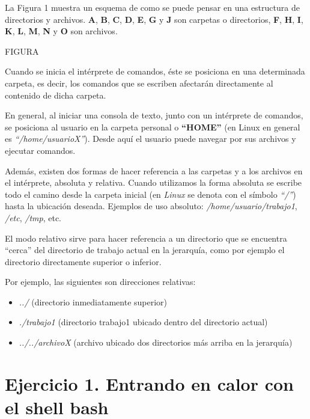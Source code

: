 \documentclass[12pt]{article}
\begin{document}
La Figura 1 muestra un esquema de como se puede pensar en una estructura de
directorios y archivos. \textbf{A}, \textbf{B}, \textbf{C}, \textbf{D},
\textbf{E}, \textbf{G} y \textbf{J} son carpetas o directorios, \textbf{F},
\textbf{H}, \textbf{I}, \textbf{K}, \textbf{L}, \textbf{M}, \textbf{N} y
\textbf{O} son archivos.

FIGURA

Cuando se inicia el intérprete de comandos, éste se posiciona en una
determinada carpeta, es decir, los comandos que se escriben afectarán
directamente al contenido de dicha carpeta.

En general, al iniciar una consola de texto, junto con un intérprete de
comandos, se posiciona al usuario en la carpeta personal o \textbf{``HOME''}
(en Linux en general es \emph{``/home/usuarioX''}). Desde aquí el usuario
puede navegar por sus archivos y ejecutar comandos.

Además, existen dos formas de hacer referencia a las carpetas y a los archivos
en el intérprete, absoluta y relativa. Cuando utilizamos la forma absoluta se
escribe todo el camino desde la carpeta inicial (en \emph{Linux} se denota con
el símbolo \emph{``/''}) hasta la ubicación deseada. Ejemplos de uso absoluto:
\emph{/home/usuario/trabajo1}, \emph{/etc}, \emph{/tmp}, etc.

El modo relativo sirve para hacer referencia a un directorio que se encuentra
``cerca'' del directorio de trabajo actual en la jerarquía, como por ejemplo
el directorio directamente superior o inferior.

Por ejemplo, las siguientes son direcciones relativas:

\begin{itemize}

    \itemsep2pt \parskip0pt 

    \item \emph{../} (directorio inmediatamente superior)

    \item \emph{./trabajo1} (directorio trabajo1 ubicado dentro del directorio
        actual)

    \item \emph{../../archivoX} (archivo ubicado dos directorios más arriba en
        la jerarquía)

\end{itemize}

\section{Ejercicio 1. Entrando en calor con el shell bash}
\end{document}

